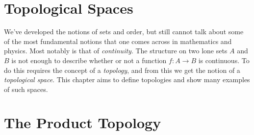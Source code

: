 \begingroup
    \ifcsname\PATH\endcsname
        \newcommand{\PATH}{books/Topology/Topological_Spaces}
        \newcommand{\OLDPATH}{\PATH}
    \else
        \newcommand{\OLDPATH}{\PATH}
        \renewcommand{\PATH}{books/Topology/Topological_Spaces}
    \fi
    \chapter{Topological Spaces}
        We've developed the notions of sets and order, but still cannot talk
        about some of the most fundamental notions that one comes across in
        mathematics and physics. Most notably is that of \textit{continuity}.
        The structure on two lone sets $A$ and $B$ is not enough to describe
        whether or not a function $f:A\rightarrow{B}$ is continuous. To do this
        requires the concept of a \textit{topology}, and from this we get the
        notion of a \textit{topological space}. This chapter aims to define
        topologies and show many examples of such spaces.
        
    \chapter{The Product Topology}
        
    \renewcommand{\PATH}{\OLDPATH}
\endgroup
